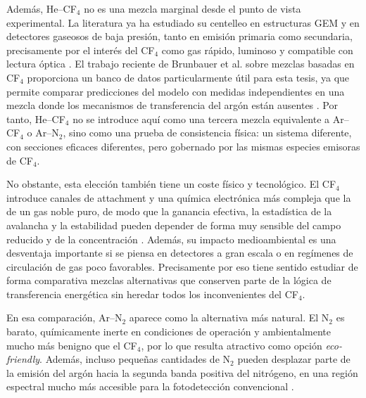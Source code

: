 \documentclass[12pt,a4paper]{article}
\begin{document}
Además, He--CF$_4$ no es una mezcla marginal desde el punto de vista experimental. La literatura ya ha estudiado su centelleo en estructuras GEM y en detectores gaseosos de baja presión, tanto en emisión primaria como secundaria, precisamente por el interés del CF$_4$ como gas rápido, luminoso y compatible con lectura óptica \cite{fraga2003the,FlorianPrimarySecundary}. El trabajo reciente de Brunbauer et al. sobre mezclas basadas en CF$_4$ proporciona un banco de datos particularmente útil para esta tesis, ya que permite comparar predicciones del modelo con medidas independientes en una mezcla donde los mecanismos de transferencia del argón están ausentes \cite{FlorianPrimarySecundary}. Por tanto, He--CF$_4$ no se introduce aquí como una tercera mezcla equivalente a Ar--CF$_4$ o Ar--N$_2$, sino como una prueba de consistencia física: un sistema diferente, con secciones eficaces diferentes, pero gobernado por las mismas especies emisoras de CF$_4$.

No obstante, esta elección también tiene un coste físico y tecnológico. El CF$_4$ introduce canales de attachment y una química electrónica más compleja que la de un gas noble puro, de modo que la ganancia efectiva, la estadística de la avalancha y la estabilidad pueden depender de forma muy sensible del campo reducido y de la concentración \cite{christophorou1999electron,tsiledakis2004drift}. Además, su impacto medioambiental es una desventaja importante si se piensa en detectores a gran escala o en regímenes de circulación de gas poco favorables. Precisamente por eso tiene sentido estudiar de forma comparativa mezclas alternativas que conserven parte de la lógica de transferencia energética sin heredar todos los inconvenientes del CF$_4$.

En esa comparación, Ar--N$_2$ aparece como la alternativa más natural. El N$_2$ es barato, químicamente inerte en condiciones de operación y ambientalmente mucho más benigno que el CF$_4$, por lo que resulta atractivo como opción \emph{eco-friendly}. Además, incluso pequeñas cantidades de N$_2$ pueden desplazar parte de la emisión del argón hacia la segunda banda positiva del nitrógeno, en una región espectral mucho más accesible para la fotodetección convencional \cite{puech1977energy,morii2004quenching,friedl2012spectral}.
\end{document}
